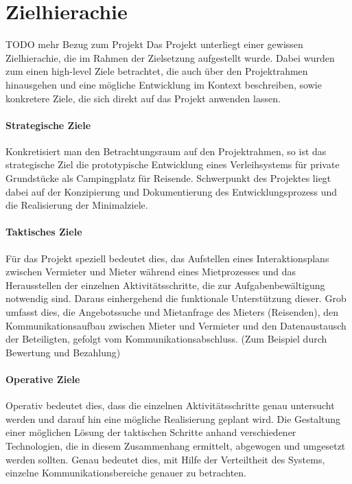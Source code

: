 
\chapter{Zielhierachie}

TODO mehr Bezug zum Projekt
Das Projekt unterliegt einer gewissen Zielhierachie, die im Rahmen der Zielsetzung aufgestellt wurde. Dabei wurden zum einen high-level Ziele betrachtet, die auch über den Projektrahmen hinausgehen und eine mögliche Entwicklung im Kontext beschreiben, sowie konkretere Ziele, die sich direkt auf das Projekt anwenden lassen.

\subsubsection{Strategische Ziele}
Konkretisiert man den Betrachtungsraum auf den Projektrahmen, so ist das strategische Ziel die prototypische Entwicklung eines Verleihsystems für private Grundstücke als Campingplatz für Reisende. Schwerpunkt des Projektes liegt dabei auf der Konzipierung und Dokumentierung des Entwicklungsprozess und die Realisierung der Minimalziele.

\subsubsection{Taktisches Ziele}
Für das Projekt speziell bedeutet dies, das Aufstellen eines Interaktionsplans zwischen Vermieter und Mieter während eines Mietprozesses und das Herausstellen der einzelnen Aktivitätsschritte, die zur Aufgabenbewältigung notwendig sind.
Daraus einhergehend die funktionale Unterstützung dieser. Grob umfasst dies, die Angebotssuche und Mietanfrage des Mieters (Reisenden), den Kommunikationsaufbau zwischen Mieter und Vermieter und den Datenaustausch der Beteiligten, gefolgt vom Kommunikationsabschluss. (Zum Beispiel durch Bewertung und Bezahlung)

\subsubsection{Operative Ziele}
Operativ bedeutet dies, dass die einzelnen Aktivitätsschritte genau untersucht werden und darauf hin eine mögliche Realisierung geplant wird. Die Gestaltung einer möglichen Lösung der taktischen Schritte anhand verschiedener Technologien, die in diesem Zusammenhang ermittelt, abgewogen und umgesetzt werden sollten.
Genau bedeutet dies, mit Hilfe der Verteiltheit des Systems, einzelne Kommunikationsbereiche genauer zu betrachten.

